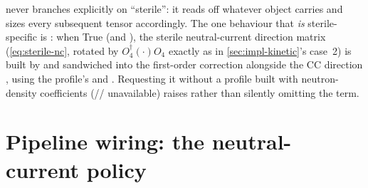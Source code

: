 
\begin{implbox}
 never branches explicitly on
``sterile'': it reads  off
whatever  object  carries and
sizes every subsequent tensor accordingly. The one behaviour that
\emph{is} sterile-specific is : when True (and
), the sterile neutral-current direction matrix
 (\cref{eq:sterile-nc}, rotated by $O_4^\dagger(\cdot)O_4$
exactly as in \cref{sec:impl-kinetic}'s case~2) is built by
 and sandwiched into the first-order
correction alongside the CC direction , using the profile's
 and
. Requesting it without a profile built with
neutron-density coefficients (//
 unavailable) raises 
rather than silently omitting the term.
\end{implbox}

\section{Pipeline wiring: the neutral-current policy}

